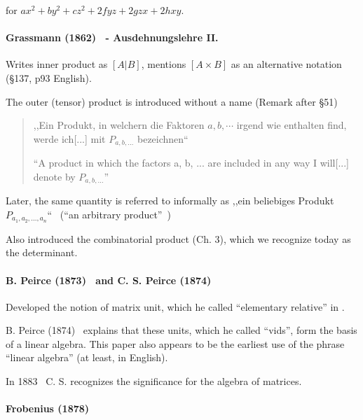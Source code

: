 for $ax^2 + by^2 + cz^2 + 2fyz + 2gzx + 2hxy$.



\paragraph{Grassmann (1862)~\cite{Grassmann1862,Grassmann2000} - Ausdehnungslehre II.}

Writes inner product as $[A | B]$, mentions $[A \times B]$ as an alternative notation (\S 137, p93 English).

The outer (tensor) product is introduced without a name (Remark after \S 51)

\begin{quote}
,,Ein Produkt, in welchern die Faktoren $a, b, \cdots$ irgend wie enthalten find, werde ich[...] mit $P_{a,b,...}$ bezeichnen`` \cite[p. 24, \S 43]{Grassmann1862}

``A product in which the factors a, b, ... are included in any way I will[...] denote by $P_{a,b,...}$''~\cite[p. 22, \S 43]{Grassmann2000}
\end{quote}

Later, the same quantity is referred to informally as
,,ein beliebiges Produkt $P_{a_1, a_2, ..., a_n}$``~\cite[\S 353]{Grassmann1862} (``an arbitrary product''~\cite[p. 196, \S 353]{Grassmann2000})

Also introduced the combinatorial product (Ch. 3), which we recognize today as the determinant.


\paragraph{B. Peirce (1873)~\cite{Peirce1873} and C. S. Peirce (1874)~\cite{Peirce1874}}

Developed the notion of matrix unit, which he called ``elementary relative'' in \cite[p.359]{Peirce1873}.

B. Peirce (1874)~\cite{Peirce1874} explains that these units, which he called ``vids'', form the basis of a linear algebra.
This paper also appears to be the earliest use of the phrase ``linear algebra'' (at least, in English).

In 1883~\cite{Peirce1883} C. S. recognizes the significance for the algebra of matrices.

\paragraph{Frobenius (1878)~\cite{Frobenius1878}}

